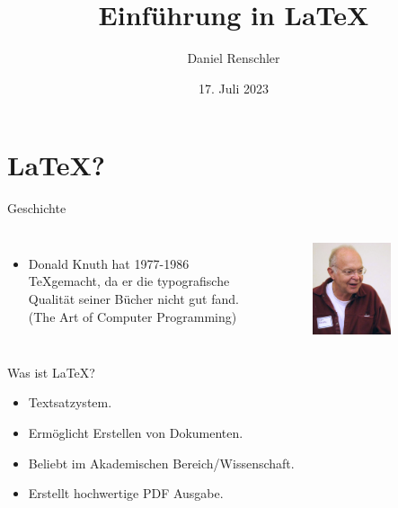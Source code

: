 \documentclass{beamer}
\title{Einf\"uhrung in \LaTeX}
\author{Daniel Renschler}
\date{17. Juli 2023}
\begin{document}
\begin{frame}
    \titlepage 
\end{frame}


\begin{frame}
    \tableofcontents
\end{frame}


\section{\LaTeX?}
\begin{frame}{Geschichte}
    \begin{columns}


    \begin{itemize}
        \item Donald Knuth hat 1977-1986 \TeX gemacht, da er die typografische Qualit\"at seiner B\"ucher nicht gut fand. (The Art of Computer Programming)

    \end{itemize}
        
        \hfill
        \begin{figure}[htpb]
            \centering
            \includegraphics[width=0.7\textwidth]{./figs/tex-knuth.jpg}
        \end{figure}
    \end{columns}
\end{frame}

\begin{frame}{Was ist \LaTeX?}
    \begin{itemize}
        \item Textsatzystem.
        \item Erm\"oglicht Erstellen von Dokumenten.
        \item Beliebt im Akademischen Bereich/Wissenschaft.
        \item Erstellt hochwertige PDF Ausgabe.
    \end{itemize}
    
\end{frame}
\end{document}
